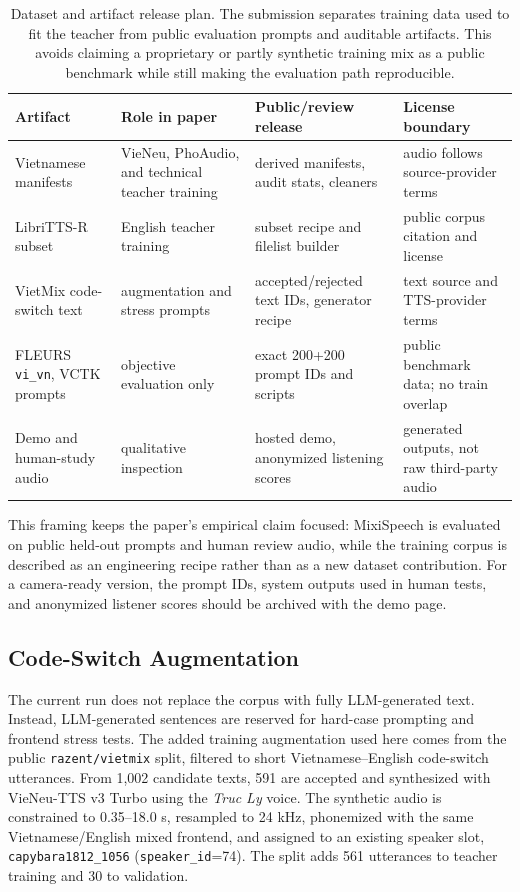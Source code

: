 \documentclass[10pt,twoside]{article}
\newcommand{\method}{MixiSpeech}
\begin{document}
\begin{table}[H]
\centering
\caption{Dataset and artifact release plan. The submission separates training
data used to fit the teacher from public evaluation prompts and auditable
artifacts. This avoids claiming a proprietary or partly synthetic training mix as
a public benchmark while still making the evaluation path reproducible.}
\label{tab:release_boundary}
\footnotesize
\setlength{\tabcolsep}{3.0pt}
\begin{tabular}{@{}p{}p{}p{}p{}@{}}
\toprule
Artifact & Role in paper & Public/review release & License boundary \\
\midrule
Vietnamese manifests & VieNeu, PhoAudio, and technical teacher training & derived manifests, audit stats, cleaners & audio follows source-provider terms \\
LibriTTS-R subset & English teacher training & subset recipe and filelist builder & public corpus citation and license \\
VietMix code-switch text & augmentation and stress prompts & accepted/rejected text IDs, generator recipe & text source and TTS-provider terms \\
FLEURS \texttt{vi\_vn}, VCTK prompts & objective evaluation only & exact 200+200 prompt IDs and scripts & public benchmark data; no train overlap \\
Demo and human-study audio & qualitative inspection & hosted demo, anonymized listening scores & generated outputs, not raw third-party audio \\
\bottomrule
\end{tabular}
\end{table}

This framing keeps the paper's empirical claim focused: \method{} is evaluated
on public held-out prompts and human review audio, while the training corpus is
described as an engineering recipe rather than as a new dataset contribution.
For a camera-ready version, the prompt IDs, system outputs used in human tests,
and anonymized listener scores should be archived with the demo page.

\subsection{Code-Switch Augmentation}

The current run does not replace the corpus with fully LLM-generated text.
Instead, LLM-generated sentences are reserved for hard-case prompting and
frontend stress tests. The added training augmentation used here comes from the
public
\texttt{razent/vietmix} split, filtered to short Vietnamese--English
code-switch utterances. From 1,002 candidate texts, 591 are accepted and
synthesized with VieNeu-TTS v3 Turbo using the \textit{Truc Ly} voice. The
synthetic audio is constrained to 0.35--18.0 s, resampled to 24 kHz, phonemized
with the same Vietnamese/English mixed frontend, and assigned to an existing
speaker slot, \texttt{capybara1812\_1056} (\texttt{speaker\_id}=74). The split
adds 561 utterances to teacher training and 30 to validation.
\end{document}
